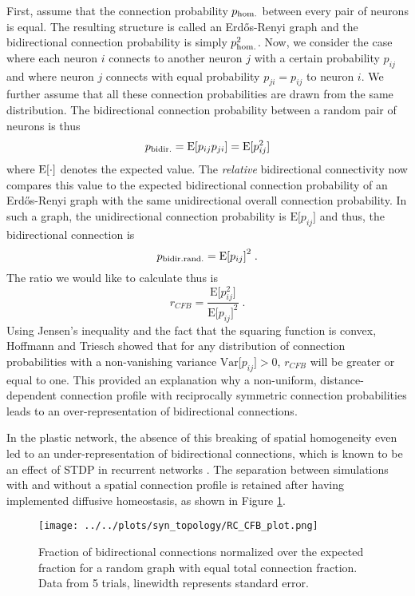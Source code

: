 \documentclass[10pt,a4paper]{article}
\begin{document}
First, assume that the connection probability $p_{\rm hom.}$ between every pair of neurons is equal. The resulting structure is called an Erd\H{o}s-Renyi graph and the bidirectional connection probability is simply $p_{\rm hom.}^2$. Now, we consider the case where each neuron $i$ connects to another neuron $j$ with a certain probability $p_{ij}$ and where neuron $j$ connects with equal probability $p_{ji}=p_{ij}$ to neuron $i$. We further assume that all these connection probabilities are drawn from the same distribution. The bidirectional connection probability between a random pair of neurons is thus
\begin{equation}
p_{\rm bidir.} = \mathrm{E[}p_{ij}p_{ji}\mathrm{]} = \mathrm{E[}p_{ij}^2\mathrm{]}
\label{bidir_prob}
\end{equation}
where $\rm E[\cdot ]$ denotes the expected value. The \textit{relative} bidirectional connectivity now compares this value to the expected bidirectional connection probability of an Erd\H{o}s-Renyi graph with the same unidirectional overall connection probability. In such a graph, the unidirectional connection probability is $\mathrm{E[}p_{ij}\mathrm{]}$ and thus, the bidirectional connection is
\begin{equation}
p_{\rm bidir. rand.} = \mathrm{E[}p_{ij}\mathrm{]}^2 \; .
\label{bidir_rand_prob}
\end{equation}
The ratio we would like to calculate thus is
\begin{equation}
r_{CFB} = \frac{\mathrm{E[}p_{ij}^2\mathrm{]}}{\mathrm{E[}p_{ij}\mathrm{]}^2} \; .
\end{equation}
Using Jensen's inequality and the fact that the squaring function is convex, Hoffmann and Triesch showed that for any distribution of connection probabilities with a non-vanishing variance $\mathrm{Var[}p_{ij}\mathrm{]} > 0$, $r_{CFB}$ will be greater or equal to one. This provided an explanation why a non-uniform, distance-dependent connection profile with reciprocally symmetric connection probabilities leads to an over-representation of bidirectional connections.

In the plastic network, the absence of this breaking of spatial homogeneity even led to an under-representation of bidirectional connections, which is known to be an effect of STDP in recurrent networks \cite{Syn_Plast_Abbott}. The separation between simulations with and without a spatial connection profile is retained after having implemented diffusive homeostasis, as shown in Figure \ref{RC_CFB_plot}. 
\begin{figure}
\texttt{[image: ../../plots/syn\_topology/RC\_CFB\_plot.png]}
\caption[Fraction of bidirectional connections]{Fraction of bidirectional connections normalized over the expected fraction for a random graph with equal total connection fraction. Data from 5 trials, linewidth represents standard error.}
\label{RC_CFB_plot}
\end{figure}
\end{document}
